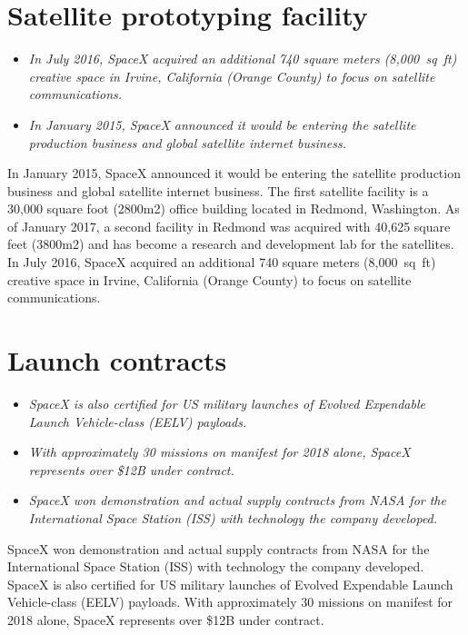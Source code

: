 \section{Satellite prototyping
facility}\label{satellite-prototyping-facility}

\begin{itemize}
\item
  \emph{In July 2016, SpaceX acquired an additional 740 square meters
  (8,000~sq~ft) creative space in Irvine, California (Orange County) to
  focus on satellite communications.}
\item
  \emph{In January 2015, SpaceX announced it would be entering the
  satellite production business and global satellite internet business.}
\end{itemize}

In January 2015, SpaceX announced it would be entering the satellite
production business and global satellite internet business. The first
satellite facility is a 30,000 square foot (2800m2) office building
located in Redmond, Washington. As of January 2017, a second facility in
Redmond was acquired with 40,625 square feet (3800m2) and has become a
research and development lab for the satellites. In July 2016, SpaceX
acquired an additional 740 square meters (8,000~sq~ft) creative space in
Irvine, California (Orange County) to focus on satellite communications.

\section{Launch contracts}\label{launch-contracts}

\begin{itemize}
\item
  \emph{SpaceX is also certified for US military launches of Evolved
  Expendable Launch Vehicle-class (EELV) payloads.}
\item
  \emph{With approximately 30 missions on manifest for 2018 alone,
  SpaceX represents over \$12B under contract.}
\item
  \emph{SpaceX won demonstration and actual supply contracts from NASA
  for the International Space Station (ISS) with technology the company
  developed.}
\end{itemize}

SpaceX won demonstration and actual supply contracts from NASA for the
International Space Station (ISS) with technology the company developed.
SpaceX is also certified for US military launches of Evolved Expendable
Launch Vehicle-class (EELV) payloads. With approximately 30 missions on
manifest for 2018 alone, SpaceX represents over \$12B under contract.

